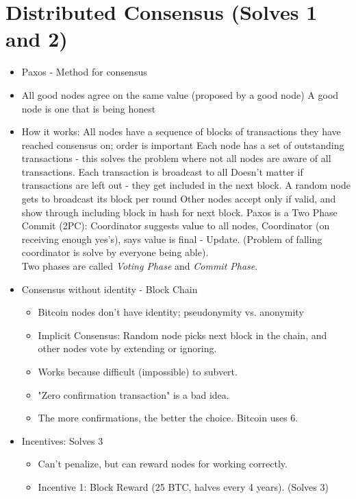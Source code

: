 \documentclass{article}
\begin{document}
\section*{Distributed Consensus (Solves 1 and 2)}
\begin{itemize}
  \item Paxos - Method for consensus
  \item All good nodes agree on the same value (proposed by a good node)
    \subitem A good node is one that is being honest
  \item How it works:
    \subitem All nodes have a sequence of blocks of transactions they have reached consensus on; order is important
    \subitem Each node has a set of outstanding transactions - this solves the problem where not all nodes are aware of all transactions.
    \subitem Each transaction is broadcast to all
    \subitem Doesn't matter if transactions are left out - they get included in the next block.
    \subitem A random node gets to broadcast its block per round
    \subitem Other nodes accept only if valid, and show through including block in hash for next block.
    \subitem Paxos is a Two Phase Commit (2PC): Coordinator suggests value to all nodes, Coordinator (on receiving enough
          yes's), says value is final - Update. (Problem of falling coordinator is solve by everyone being able).\\
          Two phases are called \emph{Voting Phase} and \emph{Commit Phase}.
  \item Consensus without identity - Block Chain
    \begin{itemize}
      \item Bitcoin nodes don't have identity; pseudonymity vs. anonymity
      \item Implicit Consensus: Random node picks next block in the chain, and other nodes vote by extending or ignoring.
      \item Works because difficult (impossible) to subvert.
      \item "Zero confirmation transaction" is a bad idea.
      \item The more confirmations, the better the choice. Bitcoin uses 6.
    \end{itemize}
  \item Incentives: Solves 3
    \begin{itemize}
      \item Can't penalize, but can reward nodes for working correctly.
      \item Incentive 1: Block Reward (25 BTC, halves every 4 years). (Solves 3)

\end{itemize}
\end{itemize}
\end{document}
